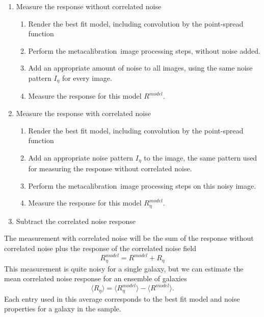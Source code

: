 \documentclass[usegraphicx,usenatbib]{mn2e}
\newcommand{\mcal}{metacalibration}
\newcommand{\mcalRnoise}{$R_\eta$}
\newcommand{\mcalRmodel}{$R^{model}$}
\newcommand{\mcalRnoisemodel}{$R^{model}_\eta$}
\begin{document}
\begin{enumerate}[label=\arabic*.]

    \item Measure the response without correlated noise
    
        \begin{enumerate}[label*=\arabic*.]
            \item Render the best fit model, including convolution by the point-spread
                function

            \item Perform the \mcal\ image processing steps, without noise added.

            \item Add an appropriate amount of noise to all images, using the
                same noise pattern $I_\eta$ for every image.

            \item Measure the response for this model \mcalRmodel.
        \end{enumerate}

    \item Measure the response with correlated noise
    
        \begin{enumerate}[label*=\arabic*.]
            \item Render the best fit model, including convolution by the point-spread
                function

            \item Add an appropriate noise pattern $I_\eta$ to the image, the
                same pattern used for measuring the response without correlated
                noise.

            \item Perform the \mcal\ image processing steps on this noisy
                image.

            \item Measure the response for this model \mcalRnoisemodel.

        \end{enumerate}

    \item Subtract the correlated noise response

\end{enumerate}

The measurement with correlated noise will be the sum of the response
without correlated noise plus the response of the correlated noise field
\begin{equation}
    \mbox{\mcalRnoisemodel} = \mbox{\mcalRmodel} + \mbox{\mcalRnoise}
\end{equation}
This measurement is quite noisy for a single galaxy, but we
can estimate the mean correlated noise response for an ensemble
of galaxies
\begin{equation}
    \langle \mbox{\mcalRnoise} \rangle = \langle \mbox{\mcalRnoisemodel} \rangle - \langle \mbox{\mcalRmodel} \rangle.
\end{equation}
Each entry used in this average corresponds to the best fit model
and noise properties for a galaxy in the sample.
\end{document}
